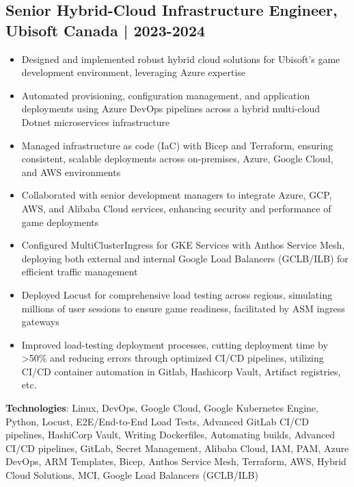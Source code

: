 \documentclass[11pt,a4paper]{article}
\begin{document}
\subsection*{Senior Hybrid-Cloud Infrastructure Engineer, Ubisoft Canada | 2023-2024}
\label{sec:org2af6ddd}
\begin{itemize}
\item Designed and implemented robust hybrid cloud solutions for Ubisoft's game development environment, leveraging Azure expertise
\item Automated provisioning, configuration management, and application deployments using Azure DevOps pipelines across a hybrid multi-cloud Dotnet microservices infrastructure
\item Managed infrastructure as code (IaC) with Bicep and Terraform, ensuring consistent, scalable deployments across on-premises, Azure, Google Cloud, and AWS environments
\item Collaborated with senior development managers to integrate Azure, GCP, AWS, and Alibaba Cloud services, enhancing security and performance of game deployments
\item Configured MultiClusterIngress for GKE Services with Anthos Service Mesh, deploying both external and internal Google Load Balancers (GCLB/ILB) for efficient traffic management
\item Deployed Locust for comprehensive load testing across regions, simulating millions of user sessions to ensure game readiness, facilitated by ASM ingress gateways
\item Improved load-testing deployment processes, cutting deployment time by >50\% and reducing errors through optimized CI/CD pipelines, utilizing CI/CD container automation in Gitlab, Hashicorp Vault, Artifact registries, etc.
\end{itemize}

\textbf{Technologies}: Linux, DevOps, Google Cloud, Google Kubernetes Engine, Python, Locust, E2E/End-to-End Load Tests, Advanced GitLab CI/CD pipelines, HashiCorp Vault, Writing Dockerfiles, Automating builds, Advanced CI/CD pipelines, GitLab, Secret Management, Alibaba Cloud, IAM, PAM, Azure DevOps, ARM Templates, Bicep, Anthos Service Mesh, Terraform, AWS, Hybrid Cloud Solutions, MCI, Google Load Balancers (GCLB/ILB)
\end{document}
